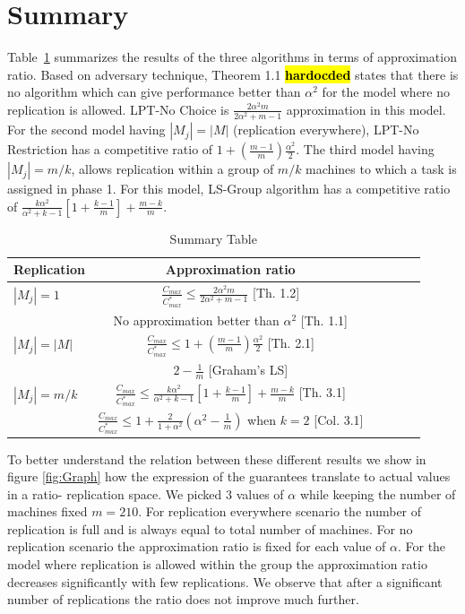\documentclass[10pt, conference, compsocconf]{IEEEtran}
\newcommand{\todo}[1]{{\color{red}\textbf{\hl{#1}}\xspace}}
\begin{document}
\section{Summary}\label{sec7}
Table~\ref{tab:template} summarizes the results of the three
algorithms in terms of approximation ratio. Based on adversary
technique, Theorem 1.1 \todo{hardocded} states that there is no
algorithm which can give performance better than $\alpha^2$ for the
model where no replication is allowed.  LPT-No Choice is
$\frac{2\alpha^{2}m}{2\alpha^{2}+ m-1}$ approximation in this
model. For the second model having $|M_j| = |M|$ (replication
everywhere), LPT-No Restriction has a competitive ratio of $1 +
(\frac{m-1}{m})\frac{\alpha^{2}}{2}$.  The third model having $|M_j| =
m/k$, allows replication within a group of $m/k$ machines to which a
task is assigned in phase 1. For this model, LS-Group algorithm has a
competitive ratio of $\frac{k\alpha^{2}}{\alpha^{2}+k-1}\left[1+
  {\frac{k-1}{m}} \right]+ {\frac{m-k}{m}}$.



\begin{table}[ht]
  \centering
  \begin{tabular}{|l|c|c|c|c|c|}
    \hline
    Replication & Approximation ratio  \\
    \hline
    $|M_j|=1$ & $\frac{C_{max}}{C_{max}^{*}}\leq \frac{2\alpha^{2}m}{2\alpha^{2}+ m-1}$ [Th. 1.2]  \\
    & No approximation better than $\alpha^2$ [Th. 1.1]   \\
    
    \hline
    $|M_j|=|M|$ & $\frac{C_{max}}{C_{max}^{*}} \leq 1 + (\frac{m-1}{m})\frac{\alpha^{2}}{2}$ [Th. 2.1]  \\
    & $2-\frac{1}{m}$ [Graham's LS]   \\
    \hline
    
    $|M_j|= m/k $ & $\frac{C_{max}}{C_{max}^{*}} \leq \frac{k\alpha^{2}}{\alpha^{2}+k-1}\left[1+ {\frac{k-1}{m}} \right]+ {\frac{m-k}{m}}$ [Th. 3.1]  \\
    & $\frac{C_{max}}{C_{max}^{*}} \leq  1+ \frac{2}{1+\alpha^{2}} \left(\alpha^2-\frac{1}{m}\right)$ when $k=2$ [Col. 3.1]   \\
    
    \hline
  \end{tabular}
  \caption{Summary Table}
  \label{tab:template}
\end{table}


To better understand the relation between these different results we
show in figure \ref{fig:Graph} how the expression of the guarantees
translate to actual values in a ratio- replication space.  We picked 3
values of $\alpha$ while keeping the number of machines fixed
$m=210$. For replication everywhere scenario the number of replication
is full and is always equal to total number of machines.  For no
replication scenario the approximation ratio is fixed for each value
of $\alpha$.  For the model where replication is allowed within the
group the approximation ratio decreases significantly with few
replications. We observe that after a significant number of
replications the ratio does not improve much further.
\end{document}
